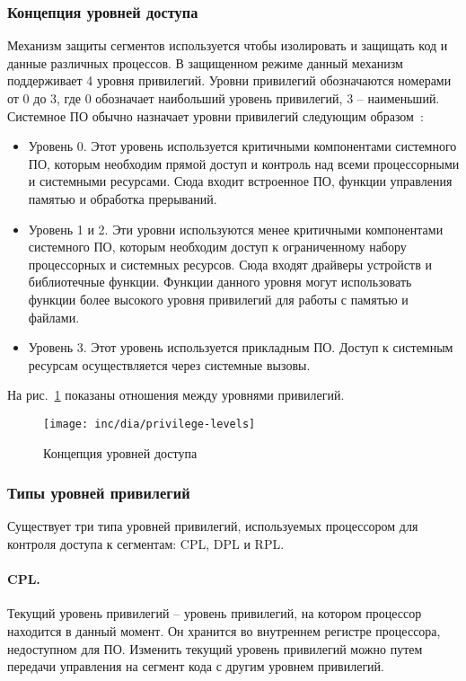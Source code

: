 \subsubsection*{Концепция уровней доступа}
Механизм защиты сегментов используется чтобы изолировать и защищать код и данные различных процессов. В защищенном
режиме данный механизм поддерживает 4 уровня привилегий. Уровни привилегий обозначаются номерами от 0 до 3,
где 0 обозначает наибольший уровень привилегий, 3 -- наименьший. Системное ПО обычно назначает уровни привилегий
следующим образом~\cite{amd_pm_v2}:
\begin{itemize}
\item Уровень 0. Этот уровень используется критичными компонентами системного ПО, которым
	необходим прямой доступ и контроль над всеми процессорными и системными ресурсами.
	Сюда входит встроенное ПО, функции управления памятью и обработка прерываний.
\item Уровень 1 и 2. Эти уровни используются менее критичными компонентами системного ПО,
	которым необходим доступ к ограниченному набору процессорных и системных ресурсов.
	Сюда входят драйверы устройств и библиотечные функции. Функции данного уровня могут
	использовать функции более высокого уровня привилегий для работы с памятью и файлами.
\item Уровень 3. Этот уровень используется прикладным ПО. Доступ к системным ресурсам осуществляется
	через системные вызовы.
\end{itemize}

На рис.~\ref{fig:privilege-levels} показаны отношения между уровнями привилегий.

\begin{figure}[ht!]
  \centering
  \texttt{[image: inc/dia/privilege-levels]}
  \caption{Концепция уровней доступа}
  \label{fig:privilege-levels}
\end{figure}

\subsubsection*{Типы уровней привилегий}
Существует три типа уровней привилегий, используемых процессором для контроля доступа к сегментам: CPL, DPL и RPL.

\paragraph{CPL.} Текущий уровень привилегий -- уровень привилегий, на котором процессор находится в данный
момент. Он хранится во внутреннем регистре процессора, недоступном для ПО. Изменить текущий уровень привилегий
можно путем передачи управления на сегмент кода с другим уровнем привилегий.


